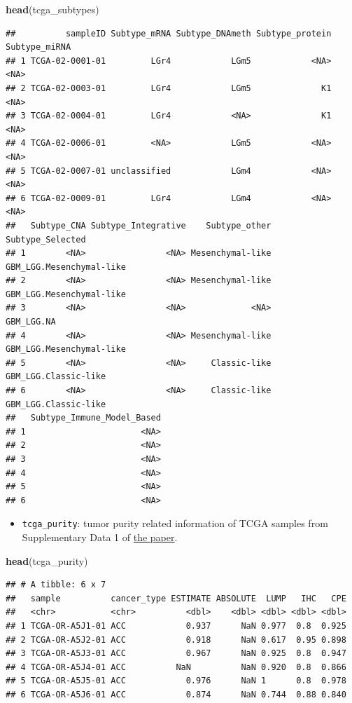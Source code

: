\documentclass[
]{book}
\newenvironment{Shaded}{\begin{snugshade}}{\end{snugshade}}
\newcommand{\FunctionTok}[1]{\textcolor[rgb]{0.13,0.29,0.53}{\textbf{#1}}}
\newcommand{\NormalTok}[1]{#1}
\providecommand{\tightlist}{%
  \setlength{\itemsep}{0pt}\setlength{\parskip}{0pt}}
\begin{document}
\begin{Shaded}
\begin{Highlighting}[]
\FunctionTok{head}\NormalTok{(tcga\_subtypes)}
\end{Highlighting}
\end{Shaded}

\begin{verbatim}
##          sampleID Subtype_mRNA Subtype_DNAmeth Subtype_protein Subtype_miRNA
## 1 TCGA-02-0001-01         LGr4            LGm5            <NA>          <NA>
## 2 TCGA-02-0003-01         LGr4            LGm5              K1          <NA>
## 3 TCGA-02-0004-01         LGr4            <NA>              K1          <NA>
## 4 TCGA-02-0006-01         <NA>            LGm5            <NA>          <NA>
## 5 TCGA-02-0007-01 unclassified            LGm4            <NA>          <NA>
## 6 TCGA-02-0009-01         LGr4            LGm4            <NA>          <NA>
##   Subtype_CNA Subtype_Integrative    Subtype_other         Subtype_Selected
## 1        <NA>                <NA> Mesenchymal-like GBM_LGG.Mesenchymal-like
## 2        <NA>                <NA> Mesenchymal-like GBM_LGG.Mesenchymal-like
## 3        <NA>                <NA>             <NA>               GBM_LGG.NA
## 4        <NA>                <NA> Mesenchymal-like GBM_LGG.Mesenchymal-like
## 5        <NA>                <NA>     Classic-like     GBM_LGG.Classic-like
## 6        <NA>                <NA>     Classic-like     GBM_LGG.Classic-like
##   Subtype_Immune_Model_Based
## 1                       <NA>
## 2                       <NA>
## 3                       <NA>
## 4                       <NA>
## 5                       <NA>
## 6                       <NA>
\end{verbatim}

\begin{itemize}
\tightlist
\item
  \texttt{tcga\_purity}: tumor purity related information of TCGA samples from Supplementary Data 1 of \href{https://doi.org/10.1038/ncomms9971}{the paper}.
\end{itemize}

\begin{Shaded}
\begin{Highlighting}[]
\FunctionTok{head}\NormalTok{(tcga\_purity)}
\end{Highlighting}
\end{Shaded}

\begin{verbatim}
## # A tibble: 6 x 7
##   sample          cancer_type ESTIMATE ABSOLUTE  LUMP   IHC   CPE
##   <chr>           <chr>          <dbl>    <dbl> <dbl> <dbl> <dbl>
## 1 TCGA-OR-A5J1-01 ACC            0.937      NaN 0.977  0.8  0.925
## 2 TCGA-OR-A5J2-01 ACC            0.918      NaN 0.617  0.95 0.898
## 3 TCGA-OR-A5J3-01 ACC            0.967      NaN 0.925  0.8  0.947
## 4 TCGA-OR-A5J4-01 ACC          NaN          NaN 0.920  0.8  0.866
## 5 TCGA-OR-A5J5-01 ACC            0.976      NaN 1      0.8  0.978
## 6 TCGA-OR-A5J6-01 ACC            0.874      NaN 0.744  0.88 0.840
\end{verbatim}
\end{document}
